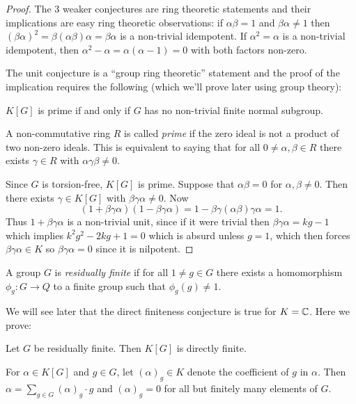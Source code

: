 \begin{proof}
    The 3 weaker conjectures are ring theoretic statements and their implications are easy ring theoretic observations: if $\alpha \beta = 1$ and $\beta \alpha \neq 1$ then $(\beta \alpha)^2 = \beta (\alpha \beta) \alpha = \beta \alpha$ is a non-trivial idempotent.
    If $\alpha^2 = \alpha$ is a non-trivial idempotent, then $\alpha^2 - \alpha = \alpha (\alpha - 1) = 0$ with both factors non-zero.

    The unit conjecture is a ``group ring theoretic'' statement and the proof of the implication requires the following (which we'll prove later using group theory):
    \begin{theorem}[Connell]
        $K[G]$ is prime if and only if $G$ has no non-trivial finite normal subgroup.
    \end{theorem}
    A non-commutative ring $R$ is called \emph{prime} if the zero ideal is not a product of two non-zero ideals.
    This is equivalent to saying that for all $0 \neq \alpha, \beta \in R$ there exists $\gamma \in R$ with $\alpha \gamma \beta \neq 0$.

    Since $G$ is torsion-free, $K[G]$ is prime.
    Suppose that $\alpha \beta = 0$ for $\alpha, \beta \neq 0$.
    Then there exists $\gamma \in K[G]$ with $\beta \gamma \alpha \neq 0$.
    Now \[
        (1 + \beta \gamma \alpha) (1 - \beta \gamma \alpha) = 1 - \beta \gamma (\alpha \beta) \gamma \alpha = 1.
    \]
    Thus $1 + \beta \gamma \alpha$ is a non-trivial unit, since if it were trivial then $\beta \gamma \alpha = kg - 1$ which implies $k^2 g^2 - 2kg + 1 = 0$ which is absurd unless $g = 1$, which then forces $\beta \gamma \alpha \in K$ so $\beta \gamma \alpha = 0$ since it is nilpotent.
\end{proof}

\begin{definition}
    A group $G$ is \emph{residually finite} if for all $1 \neq g \in G$ there exists a homomorphism $\phi_g \colon G \to Q$ to a finite group such that $\phi_g (g) \neq 1$.
\end{definition}

We will see later that the direct finiteness conjecture is true for $K = \mathbb{C}$.
Here we prove:

\begin{proposition}
    Let $G$ be residually finite.
    Then $K[G]$ is directly finite.
\end{proposition}

\begin{notation}
For $\alpha \in K[G]$ and $g \in G$, let $(\alpha)_g \in K$ denote the coefficient of $g$ in $\alpha$.
Then $\alpha = \sum_{g \in G} (\alpha)_g \cdot g$ and $(\alpha)_g = 0$ for all but finitely many elements of $G$.
\end{notation}

